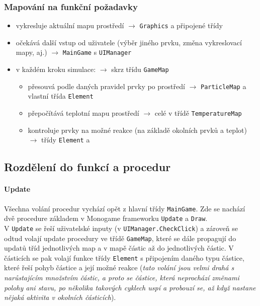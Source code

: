 \documentclass[a4paper, 12pt]{article}
\begin{document}
\newpage
\subsubsection{Mapování na funkční požadavky}
\begin{itemize}
    \item vykresluje aktuální mapu prostředí \(\rightarrow\) \texttt{Graphics} a připojené
        třídy
    \item očekává další vstup od uživatele (výběr jiného prvku, změna
        vykreslovací mapy, aj.) \(\rightarrow\) \texttt{MainGame} s \texttt{UIManager}
    \item v každém kroku simulace: \(\rightarrow\) skrz třídu \texttt{GameMap}
        \begin{itemize}
            \item přesouvá podle daných pravidel prvky po prostředí \(\rightarrow\)
                \texttt{ParticleMap} a vlastní třída \texttt{Element}
            \item přepočítává teplotní mapu prostředí \(\rightarrow\) celé v třídě
                \texttt{TemperatureMap}
            \item kontroluje prvky na možné reakce (na základě okolních prvků a
                teplot) \(\rightarrow\) třídy \texttt{Element} a \texttt{}
        \end{itemize}
\end{itemize}

\subsection{Rozdělení do funkcí a procedur}
\paragraph{Update}
Všechna volání procedur vychází opět z hlavní třídy \texttt{MainGame}.
Zde se nachází dvě procedure základem v Monogame frameworku \texttt{Update} a
\texttt{Draw}. \\V \texttt{Update} se řeší uživatelské inputy (v
\texttt{UIManager.CheckClick}) a zároveň se odtud volají update procedury ve třídě
\texttt{GameMap}, které se dále propagují do updatů tříd jednotlivých map a v
mapě částic až do jednotlivých částic. V částicích se pak volají funkce třídy
\texttt{Element} s připojením daného typu částice, které řeší pohyb částice a
její možné reakce (\emph{tato volání jsou velmi drahá s narůstajícím množstvím
    částic, a proto se částice, která neprochází změnami polohy ani stavu, po 
    několika takových cyklech uspí a probouzí se, až když nastane nějaká aktivita v okolních částicích}).
\end{document}
